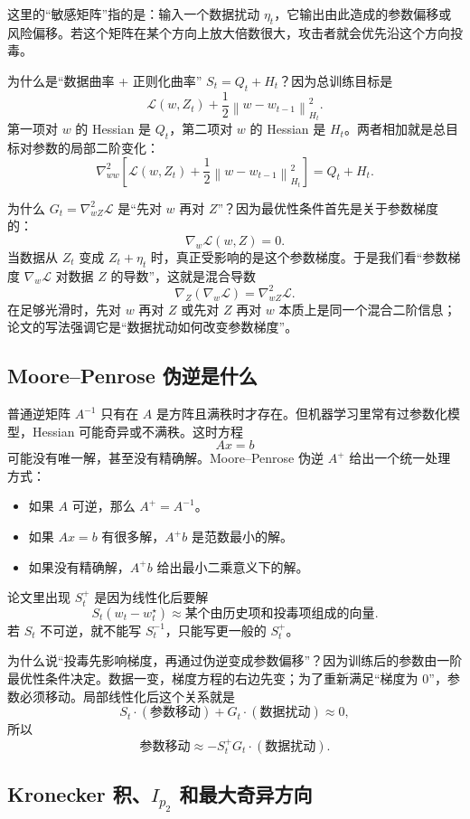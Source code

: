 \documentclass[UTF8,fontset=none,11pt]{ctexart}
\theoremstyle{cnstyle}
\newcommand{\calL}{\mathcal{L}}
\newcommand{\norm}[1]{\left\lVert #1\right\rVert}
\begin{document}
这里的“敏感矩阵”指的是：输入一个数据扰动 \(\eta_t\)，它输出由此造成的参数偏移或风险偏移。若这个矩阵在某个方向上放大倍数很大，攻击者就会优先沿这个方向投毒。

为什么是“数据曲率 + 正则化曲率” \(S_t=Q_t+H_t\)？因为总训练目标是
\[
  \calL(w,Z_t)+\frac12\norm{w-w_{t-1}}_{H_t}^2 .
\]
第一项对 \(w\) 的 Hessian 是 \(Q_t\)，第二项对 \(w\) 的 Hessian 是 \(H_t\)。两者相加就是总目标对参数的局部二阶变化：
\[
  \nabla_{ww}^2
  \left[
  \calL(w,Z_t)+\frac12\norm{w-w_{t-1}}_{H_t}^2
  \right]
  =
  Q_t+H_t.
\]

为什么 \(G_t=\nabla_{wZ}^2\calL\) 是“先对 \(w\) 再对 \(Z\)”？因为最优性条件首先是关于参数梯度的：
\[
  \nabla_w\calL(w,Z)=0.
\]
当数据从 \(Z_t\) 变成 \(Z_t+\eta_t\) 时，真正受影响的是这个参数梯度。于是我们看“参数梯度 \(\nabla_w\calL\) 对数据 \(Z\) 的导数”，这就是混合导数
\[
  \nabla_Z(\nabla_w\calL)=\nabla_{wZ}^2\calL.
\]
在足够光滑时，先对 \(w\) 再对 \(Z\) 或先对 \(Z\) 再对 \(w\) 本质上是同一个混合二阶信息；论文的写法强调它是“数据扰动如何改变参数梯度”。

\subsection{Moore--Penrose 伪逆是什么}

普通逆矩阵 \(A^{-1}\) 只有在 \(A\) 是方阵且满秩时才存在。但机器学习里常有过参数化模型，Hessian 可能奇异或不满秩。这时方程
\[
  Ax=b
\]
可能没有唯一解，甚至没有精确解。Moore--Penrose 伪逆 \(A^+\) 给出一个统一处理方式：
\begin{itemize}
  \item 如果 \(A\) 可逆，那么 \(A^+=A^{-1}\)。
  \item 如果 \(Ax=b\) 有很多解，\(A^+b\) 是范数最小的解。
  \item 如果没有精确解，\(A^+b\) 给出最小二乘意义下的解。
\end{itemize}

论文里出现 \(S_t^+\) 是因为线性化后要解
\[
  S_t(w_t-w_t^\star)
  \approx
  \text{某个由历史项和投毒项组成的向量}.
\]
若 \(S_t\) 不可逆，就不能写 \(S_t^{-1}\)，只能写更一般的 \(S_t^+\)。

为什么说“投毒先影响梯度，再通过伪逆变成参数偏移”？因为训练后的参数由一阶最优性条件决定。数据一变，梯度方程的右边先变；为了重新满足“梯度为 0”，参数必须移动。局部线性化后这个关系就是
\[
  S_t\cdot(\text{参数移动})
  +
  G_t\cdot(\text{数据扰动})
  \approx 0,
\]
所以
\[
  \text{参数移动}
  \approx
  -S_t^+G_t\cdot(\text{数据扰动}).
\]

\subsection{Kronecker 积、\(I_{p_2}\) 和最大奇异方向}
\end{document}
